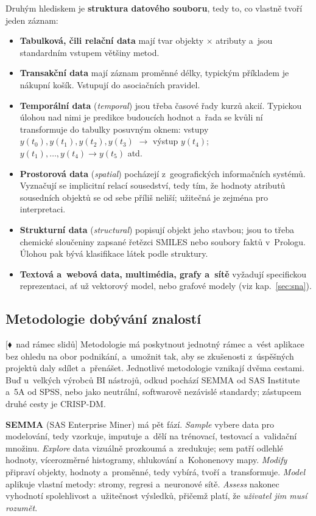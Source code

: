 \documentclass[11pt,a4paper]{article}
\theoremstyle{definition}
\newcommand{\mimo}{\textcolor{markcol}{\textsf{\footnotesize[$\blacklozenge$~nad rámec slidů]}}}
\begin{document}
Druhým hlediskem je \textbf{struktura datového souboru}, tedy to, co vlastně tvoří jeden
záznam:
\begin{itemize}
\item \textbf{Tabulková, čili relační data} mají tvar objekty $\times$ atributy a~jsou
      standardním vstupem většiny metod.
\item \textbf{Transakční data} mají záznam proměnné délky, typickým příkladem je nákupní
      košík. Vstupují do asociačních pravidel.
\item \textbf{Temporální data} (\emph{temporal}) jsou třeba časové řady kurzů akcií.
      Typickou úlohou nad nimi je predikce budoucích hodnot a~řada se kvůli ní
      transformuje do tabulky posuvným oknem: vstupy $y(t_0),y(t_1),y(t_2),y(t_3)$ $\to$
      výstup $y(t_4)$; $y(t_1),\dots,y(t_4)\to y(t_5)$ atd.
\item \textbf{Prostorová data} (\emph{spatial}) pocházejí z~geografických informačních
      systémů. Vyznačují se implicitní relací sousedství, tedy tím, že hodnoty atributů
      sousedních objektů se od sebe příliš neliší; užitečná je zejména pro interpretaci.
\item \textbf{Strukturní data} (\emph{structural}) popisují objekt jeho stavbou; jsou to
      třeba chemické sloučeniny zapsané řetězci SMILES nebo soubory faktů v~Prologu.
      Úlohou pak bývá klasifikace látek podle struktury.
\item \textbf{Textová a~webová data, multimédia, grafy a~sítě} vyžadují specifickou
      reprezentaci, ať už vektorový model, nebo grafové modely (viz kap.~\ref{sec:sna}).
\end{itemize}

\subsection{Metodologie dobývání znalostí}
\label{ssec:metodologie}

\mimo{} Metodologie má poskytnout jednotný rámec a~vést aplikace bez ohledu na obor
podnikání, a~umožnit tak, aby se zkušenosti z~úspěšných projektů daly sdílet a~přenášet.
Jednotlivé metodologie vznikají dvěma cestami. Buď u~velkých výrobců BI nástrojů, odkud
pochází SEMMA od SAS Institute a~5A od SPSS, nebo jako neutrální, softwarově nezávislé
standardy; zástupcem druhé cesty je CRISP-DM.

\textbf{SEMMA} (SAS Enterprise Miner) má pět fází. \emph{Sample} vybere data pro
modelování, tedy vzorkuje, imputuje a~dělí na trénovací, testovací a~validační množinu.
\emph{Explore} data vizuálně prozkoumá a~zredukuje; sem patří odlehlé hodnoty,
vícerozměrné histogramy, shlukování a~Kohonenovy mapy. \emph{Modify} připraví objekty,
hodnoty a~proměnné, tedy vybírá, tvoří a~transformuje. \emph{Model} aplikuje vlastní
metody: stromy, regresi a~neuronové sítě. \emph{Assess} nakonec vyhodnotí spolehlivost
a~užitečnost výsledků, přičemž platí, že \emph{uživatel jim musí rozumět}.
\end{document}

